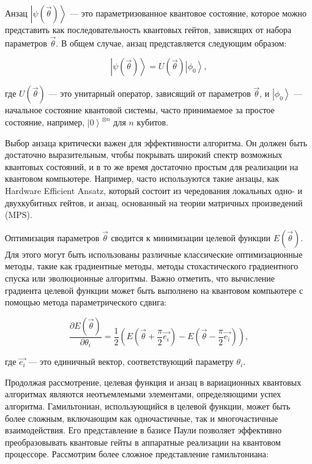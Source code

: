 \documentclass[a4paper]{report}
\newcommand{\ket}[1] {{\ensuremath{\left|#1\right\rangle}}}
\begin{document}
Анзац $\ket{\psi(\vec{\theta})}$ — это параметризованное квантовое состояние, которое можно представить как последовательность квантовых гейтов, зависящих от набора параметров $\vec{\theta}$. В общем случае, анзац представляется следующим образом:

\begin{equation}
\ket{\psi(\vec{\theta})} = U(\vec{\theta}) \ket{\phi_0},
\end{equation}

где $U(\vec{\theta})$ — это унитарный оператор, зависящий от параметров $\vec{\theta}$, и $\ket{\phi_0}$ — начальное состояние квантовой системы, часто принимаемое за простое состояние, например, $\ket{0}^{\otimes n}$ для $n$ кубитов.

Выбор анзаца критически важен для эффективности алгоритма. Он должен быть достаточно выразительным, чтобы покрывать широкий спектр возможных квантовых состояний, и в то же время достаточно простым для реализации на квантовом компьютере. Например, часто используются такие анзацы, как Hardware Efficient Ansatz, который состоит из чередования локальных одно- и двухкубитных гейтов, и анзац, основанный на теории матричных произведений (MPS).

Оптимизация параметров $\vec{\theta}$ сводится к минимизации целевой функции $E(\vec{\theta})$. Для этого могут быть использованы различные классические оптимизационные методы, такие как градиентные методы, методы стохастического градиентного спуска или эволюционные алгоритмы. Важно отметить, что вычисление градиента целевой функции может быть выполнено на квантовом компьютере с помощью метода параметрического сдвига:

\begin{equation}
\frac{\partial E(\vec{\theta})}{\partial \theta_i} = \frac{1}{2} \left( E(\vec{\theta} + \frac{\pi}{2} \vec{e_i}) - E(\vec{\theta} - \frac{\pi}{2} \vec{e_i}) \right),
\end{equation}

где $\vec{e_i}$ — это единичный вектор, соответствующий параметру $\theta_i$.

Продолжая рассмотрение, целевая функция и анзац в вариационных квантовых алгоритмах являются неотъемлемыми элементами, определяющими успех алгоритма. Гамильтониан, использующийся в целевой функции, может быть более сложным, включающим как одночастичные, так и многочастичные взаимодействия. Его представление в базисе Паули позволяет эффективно преобразовывать квантовые гейты в аппаратные реализации на квантовом процессоре. Рассмотрим более сложное представление гамильтониана:
\end{document}
